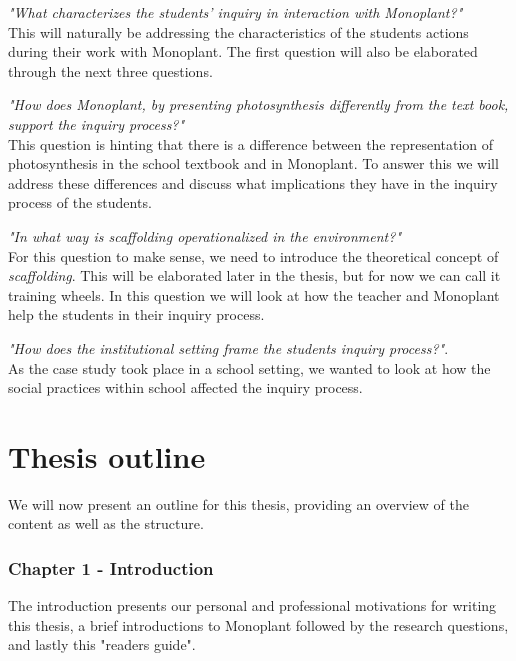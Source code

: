 \begin{noindlist}
\item \emph{"What characterizes the students’ inquiry in interaction with Monoplant?"}\\
This will naturally be addressing the characteristics of the students actions during their work with Monoplant. The first question will also be elaborated through the next three questions.
\item \emph{"How does Monoplant, by presenting photosynthesis differently from the text book, support the inquiry process?"}\\
This question is hinting that there is a difference between the representation of photosynthesis in the school textbook and in Monoplant. To answer this we will address these differences and discuss what implications they have in the inquiry process of the students.
\item \emph{"In what way is scaffolding operationalized in the environment?"}\\
For this question to make sense, we need to introduce the theoretical concept of \emph{scaffolding}. This will be elaborated later in the thesis, but for now we can call it training wheels. In this question we will look at how the teacher and Monoplant help the students in their inquiry process.
\item \emph{"How does the institutional setting frame the students inquiry process?"}.\\
As the case study took place in a school setting, we wanted to look at how the social practices within school affected the inquiry process.
\end{noindlist}


\section{Thesis outline}
We will now present an outline for this thesis, providing an overview of the content as well as the structure. 

\subsubsection*{Chapter 1 - Introduction}
The introduction presents our personal and professional motivations for writing this thesis, a brief introductions to Monoplant followed by the research questions, and lastly this "readers guide".

